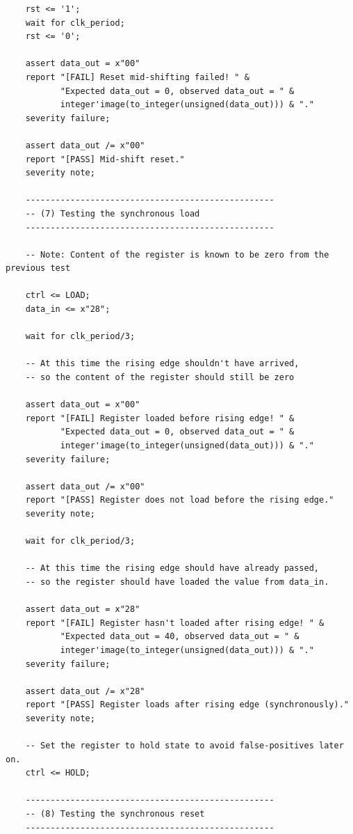 \documentclass[10pt]{article}
\begin{document}
\begin{verbatim}
    rst <= '1';
    wait for clk_period;
    rst <= '0';
    
    assert data_out = x"00"
    report "[FAIL] Reset mid-shifting failed! " &
           "Expected data_out = 0, observed data_out = " & 
           integer'image(to_integer(unsigned(data_out))) & "."
    severity failure;

    assert data_out /= x"00"
    report "[PASS] Mid-shift reset."
    severity note;
      
    --------------------------------------------------
    -- (7) Testing the synchronous load
    --------------------------------------------------
    
    -- Note: Content of the register is known to be zero from the previous test
    
    ctrl <= LOAD;
    data_in <= x"28";
 
    wait for clk_period/3;
    
    -- At this time the rising edge shouldn't have arrived, 
    -- so the content of the register should still be zero
    
    assert data_out = x"00"
    report "[FAIL] Register loaded before rising edge! " &
           "Expected data_out = 0, observed data_out = " & 
           integer'image(to_integer(unsigned(data_out))) & "."
    severity failure;
    
    assert data_out /= x"00"
    report "[PASS] Register does not load before the rising edge."
    severity note;
    
    wait for clk_period/3;
        
    -- At this time the rising edge should have already passed,
    -- so the register should have loaded the value from data_in.
    
    assert data_out = x"28"
    report "[FAIL] Register hasn't loaded after rising edge! " &
           "Expected data_out = 40, observed data_out = " & 
           integer'image(to_integer(unsigned(data_out))) & "."
    severity failure;
    
    assert data_out /= x"28"
    report "[PASS] Register loads after rising edge (synchronously)."
    severity note;
    
    -- Set the register to hold state to avoid false-positives later on.
    ctrl <= HOLD;
    
    --------------------------------------------------
    -- (8) Testing the synchronous reset
    --------------------------------------------------
    

\end{verbatim}
\end{document}
